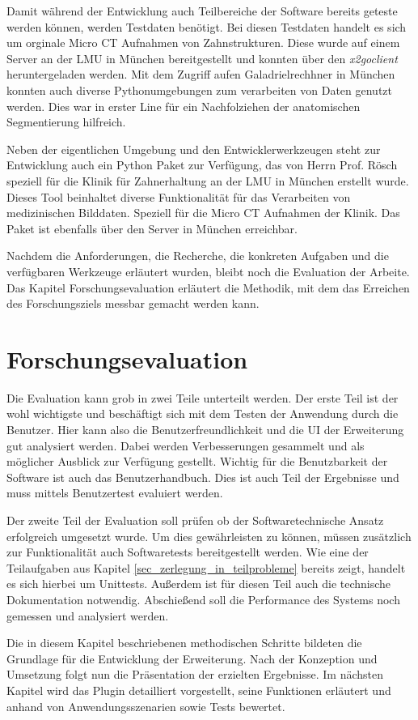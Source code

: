 Damit während der Entwicklung auch Teilbereiche der Software bereits geteste
werden können, werden Testdaten benötigt. Bei diesen Testdaten handelt es sich
um orginale Micro CT Aufnahmen von Zahnstrukturen. Diese wurde auf einem Server an
der LMU in München bereitgestellt und konnten über den \textit{x2goclient}
heruntergeladen werden. Mit dem Zugriff aufen Galadrielrechhner in München konnten
auch diverse Pythonumgebungen zum verarbeiten von Daten genutzt werden. Dies war
in erster Line für ein Nachfolziehen der anatomischen Segmentierung hilfreich.

Neben der eigentlichen Umgebung und den Entwicklerwerkzeugen steht zur
Entwicklung auch ein Python Paket zur Verfügung, das von Herrn Prof. Rösch
speziell für die Klinik für Zahnerhaltung an der LMU in München erstellt wurde. Dieses
Tool beinhaltet diverse Funktionalität für das Verarbeiten von medizinischen Bilddaten.
Speziell für die Micro CT Aufnahmen der Klinik. Das Paket ist ebenfalls über den
Server in München erreichbar.

Nachdem die Anforderungen, die Recherche, die konkreten Aufgaben und die verfügbaren
Werkzeuge erläutert wurden, bleibt noch die Evaluation der Arbeite. Das Kapitel Forschungsevaluation
erläutert die Methodik, mit dem das Erreichen des Forschungsziels messbar
gemacht werden kann.


\section{Forschungsevaluation}
Die Evaluation kann grob in zwei Teile unterteilt werden. Der erste Teil ist der
wohl wichtigste und beschäftigt sich mit dem Testen der Anwendung durch die
Benutzer. Hier kann also die Benutzerfreundlichkeit und die UI der Erweiterung gut
analysiert werden. Dabei werden Verbesserungen gesammelt und als möglicher
Ausblick zur Verfügung gestellt. Wichtig für die Benutzbarkeit der Software ist auch
das Benutzerhandbuch. Dies ist auch Teil der Ergebnisse und muss mittels
Benutzertest evaluiert werden.

Der zweite Teil der Evaluation soll prüfen ob der Softwaretechnische Ansatz
erfolgreich umgesetzt wurde. Um dies gewährleisten zu können, müssen zusätzlich
zur Funktionalität auch Softwaretests bereitgestellt werden. Wie eine der Teilaufgaben
aus Kapitel \ref{sec_zerlegung_in_teilprobleme} bereits zeigt, handelt es sich
hierbei um Unittests. Außerdem ist für diesen Teil auch die technische Dokumentation
notwendig. Abschießend soll die Performance des Systems noch gemessen und
analysiert werden.

Die in diesem Kapitel beschriebenen methodischen Schritte bildeten die Grundlage
für die Entwicklung der Erweiterung. Nach der Konzeption und Umsetzung folgt nun
die Präsentation der erzielten Ergebnisse. Im nächsten Kapitel wird das Plugin
detailliert vorgestellt, seine Funktionen erläutert und anhand von Anwendungsszenarien
sowie Tests bewertet.
